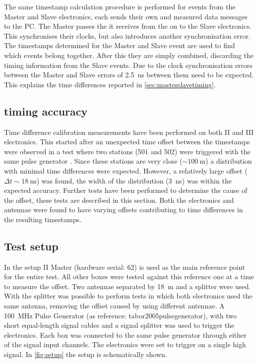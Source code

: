 The same timestamp calculation procedure is performed for events from the Master and Slave electronics, each sends their own \osm and measured data messages to the PC. The Master passes the \pps it receives from the \gps on to the Slave electronics. This synchronises their clocks, but also introduces another synchronisation error. The timestamps determined for the Master and Slave event are used to find which events belong together. After this they are simply combined, discarding the timing information from the Slave events. Due to the clock synchronisation errors between the Master and Slave errors of \SI{2.5}{\ns} between them need to be expected. This explains the time differences reported in \cref{sec:masterslavetiming}.


\subsection{\gps timing accuracy}
\label{sec:gps_accuracy}

Time difference calibration measurements have been performed on both \hisparc II and III electronics. This started after an unexpected time offset between the timestamps were observed in a test where two \hisparc stations (501 and 502) were triggered with the same pulse generator \cite[p. 47]{fokkema2012hisparc}. Since these stations are very close ($\sim\SI{100}{\meter}$) a distribution with minimal time differences were expected. However, a relatively large offset ($\Delta t \sim\SI{18}{\ns}$) was found, the width of the distribution (\SI{3}{\ns}) was within the expected \gps accuracy. Further tests have been performed to determine the cause of the offset, these tests are described in this section. Both the \hisparc electronics and \gps antennae were found to have varying offsets contributing to time differences in the resulting timestamps.


\subsection{Test setup}
\label{sub:gps_test_setup}

In the setup \hisparc II Master (hardware serial: 62) is used as the main reference point for the entire test. All other \hisparc boxes were tested against this reference one at a time to measure the offset. Two \gps antennae separated by \SI{18}{\meter} and a \gps splitter were used. With the splitter was possible to perform tests in which both \hisparc electronics used the same \gps antenna, removing the offset caused by using different \gps antennae. A \SI{100}{\mega\hertz} Pulse Generator (as reference: tabor2005pulsegenerator), with two short equal-length signal cables and a signal splitter was used to trigger the \hisparc electronics. Each box was connected to the same pulse generator through either of the signal input channels. The electronics were set to trigger on a single high signal. In \cref{fig:setup} the setup is schematically shown.

